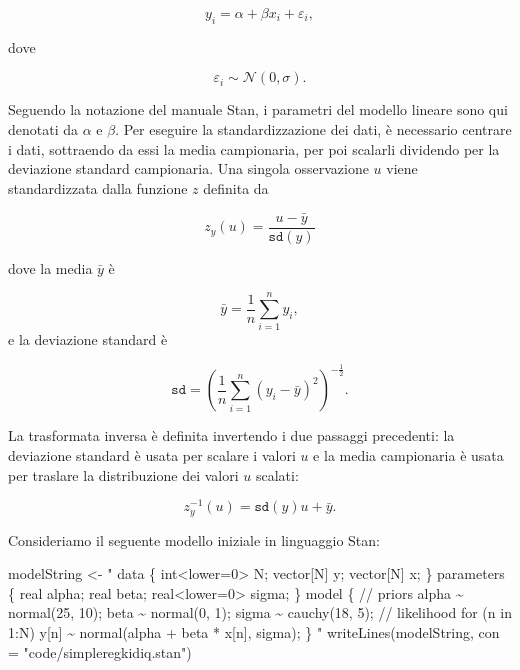 \documentclass[
  11pt,
]{krantz}
\makeatletter
\newenvironment{Shaded}{\begin{snugshade}}{\end{snugshade}}
\newcommand{\AttributeTok}[1]{\textcolor[rgb]{0.61,0.61,0.61}{#1}}
\newcommand{\FunctionTok}[1]{\textcolor[rgb]{0,0,0}{#1}}
\newcommand{\NormalTok}[1]{#1}
\newcommand{\OtherTok}[1]{\textcolor[rgb]{0.37,0.37,0.37}{#1}}
\newcommand{\StringTok}[1]{\textcolor[rgb]{0.5,0.5,0.5}{#1}}
\newenvironment{kframe}{%
\medskip{}
\setlength{\fboxsep}{.8em}
 \def\at@end@of@kframe{}%
 \ifinner\ifhmode%
  \def\at@end@of@kframe{\end{minipage}}%
  \begin{minipage}{\columnwidth}%
 \fi\fi%
 \def\FrameCommand##1{\hskip\@totalleftmargin \hskip-\fboxsep
 \colorbox{shadecolor}{##1}\hskip-\fboxsep
     \hskip-\linewidth \hskip-\@totalleftmargin \hskip\columnwidth}%
 \MakeFramed {\advance\hsize-\width
   \@totalleftmargin\z@ \linewidth\hsize
   \@setminipage}}%
 {\par\unskip\endMakeFramed%
 \at@end@of@kframe}
\renewenvironment{Shaded}{\begin{kframe}}{\end{kframe}}
\makeatother
\begin{document}
\[
y_i = \alpha + \beta x_i + \varepsilon_i,
\]

dove

\[
\varepsilon_i \sim \mathcal{N}(0, \sigma).
\]

Seguendo la notazione del manuale Stan, i parametri del modello lineare sono qui denotati da \(\alpha\) e \(\beta\). Per eseguire la standardizzazione dei dati, è necessario centrare i dati, sottraendo da essi la media campionaria, per poi scalarli dividendo per la deviazione standard campionaria. Una singola osservazione \(u\) viene standardizzata dalla funzione \(z\) definita da

\[
z_y(u) = \frac{u - \bar{y}}{\texttt{sd}(y)}
\]

dove la media \(\bar{y}\) è

\[
\bar{y} = \frac{1}{n} \sum_{i=1}^n y_i,
\] e la deviazione standard è

\[
\texttt{sd} = \left(\frac{1}{n}\sum_{i=1}^n(y_i - \bar{y})^2\right)^{-\frac{1}{2}}.
\]

La trasformata inversa è definita invertendo i due passaggi precedenti: la deviazione standard è usata per scalare i valori \(u\) e la media campionaria è usata per traslare la distribuzione dei valori \(u\) scalati:

\[
z_y^{-1}(u) = \texttt{sd}(y)u + \bar{y}.
\]

Consideriamo il seguente modello iniziale in linguaggio Stan:

\begin{Shaded}
\begin{Highlighting}[]
\NormalTok{modelString }\OtherTok{\textless{}{-}} \StringTok{"}
\StringTok{data \{}
\StringTok{  int\textless{}lower=0\textgreater{} N;}
\StringTok{  vector[N] y;}
\StringTok{  vector[N] x;}
\StringTok{\}}
\StringTok{parameters \{}
\StringTok{  real alpha;}
\StringTok{  real beta;}
\StringTok{  real\textless{}lower=0\textgreater{} sigma;}
\StringTok{\}}
\StringTok{model \{}
\StringTok{  // priors}
\StringTok{  alpha \textasciitilde{} normal(25, 10);}
\StringTok{  beta \textasciitilde{} normal(0, 1);}
\StringTok{  sigma \textasciitilde{} cauchy(18, 5);}
\StringTok{  // likelihood}
\StringTok{  for (n in 1:N)}
\StringTok{    y[n] \textasciitilde{} normal(alpha + beta * x[n], sigma);}
\StringTok{\}}
\StringTok{"}
\FunctionTok{writeLines}\NormalTok{(modelString, }\AttributeTok{con =} \StringTok{"code/simpleregkidiq.stan"}\NormalTok{)}
\end{Highlighting}
\end{Shaded}
\end{document}
